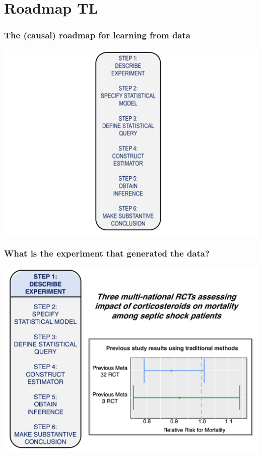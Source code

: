 \documentclass[t]{beamer}
\begin{document}
\section{Roadmap TL}

\begin{frame}
  \frametitle{The (causal) roadmap for learning from data}
  \vspace{-20pt}
  \begin{center}
  \includegraphics[width = 1.05\textwidth]{figures/roadmap.pdf}
  \end{center}
\end{frame}

\begin{frame}
  \frametitle{What is the experiment that generated the data?}
  \vspace{-20pt}
  \begin{center}
  \includegraphics[width = 1.05\textwidth]{figures/roadmap1_1.pdf}
  \end{center}
\end{frame}
\end{document}
